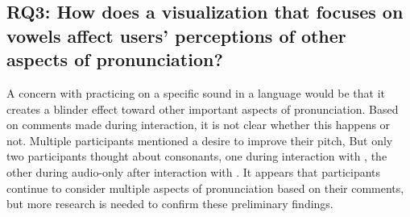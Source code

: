 \subsection{RQ3: How does a visualization that focuses on vowels affect users' perceptions of other aspects of pronunciation?}
A concern with practicing on a specific sound in a language would be that it creates a blinder effect toward other important aspects of pronunciation. Based on comments made during interaction, it is not clear whether this happens or not. Multiple participants mentioned a desire to improve their pitch, But only two participants thought about consonants, one during interaction with \visowel{}, the other during audio-only after interaction with \visowel{}. It appears that participants continue to consider multiple aspects of pronunciation based on their comments, but more research is needed to confirm these preliminary findings. 